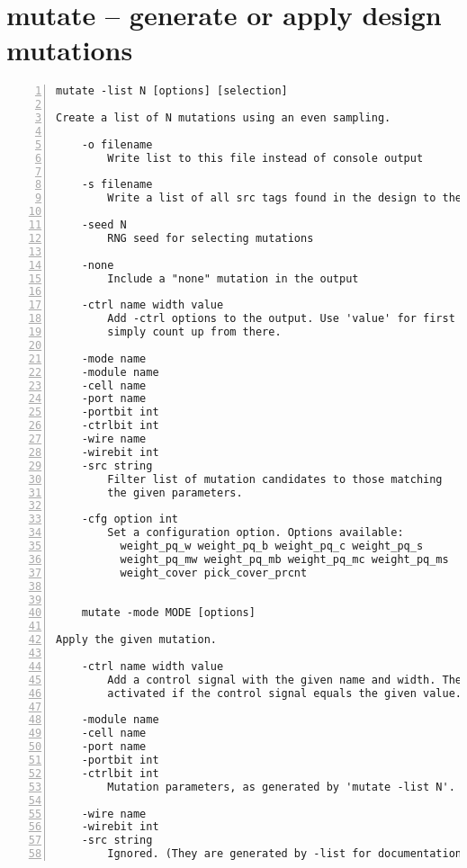 \section{mutate -- generate or apply design mutations}
\label{cmd:mutate}
\begin{lstlisting}[numbers=left,frame=single]
    mutate -list N [options] [selection]

Create a list of N mutations using an even sampling.

    -o filename
        Write list to this file instead of console output

    -s filename
        Write a list of all src tags found in the design to the specified file

    -seed N
        RNG seed for selecting mutations

    -none
        Include a "none" mutation in the output

    -ctrl name width value
        Add -ctrl options to the output. Use 'value' for first mutation, then
        simply count up from there.

    -mode name
    -module name
    -cell name
    -port name
    -portbit int
    -ctrlbit int
    -wire name
    -wirebit int
    -src string
        Filter list of mutation candidates to those matching
        the given parameters.

    -cfg option int
        Set a configuration option. Options available:
          weight_pq_w weight_pq_b weight_pq_c weight_pq_s
          weight_pq_mw weight_pq_mb weight_pq_mc weight_pq_ms
          weight_cover pick_cover_prcnt


    mutate -mode MODE [options]

Apply the given mutation.

    -ctrl name width value
        Add a control signal with the given name and width. The mutation is
        activated if the control signal equals the given value.

    -module name
    -cell name
    -port name
    -portbit int
    -ctrlbit int
        Mutation parameters, as generated by 'mutate -list N'.

    -wire name
    -wirebit int
    -src string
        Ignored. (They are generated by -list for documentation purposes.)
\end{lstlisting}

